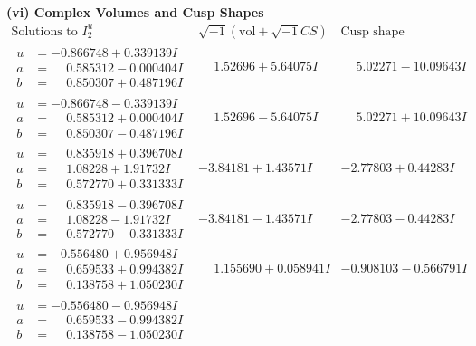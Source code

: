 \documentclass[1p]{elsarticle_modified}
\theoremstyle{definition}
\newcommand{\I}{\sqrt{-1}}
\begin{document}
\newpage\flushleft \textbf{(vi) Complex Volumes and Cusp Shapes}
$$\begin{array}{c|c|c}  
\text{Solutions to }I^u_{2}& \I (\text{vol} + \sqrt{-1}CS) & \text{Cusp shape}\\
 \hline 
\begin{aligned}
u &= -0.866748 + 0.339139 I \\
a &= \phantom{-}0.585312 - 0.000404 I \\
b &= \phantom{-}0.850307 + 0.487196 I\end{aligned}
 & \phantom{-}1.52696 + 5.64075 I & \phantom{-}5.02271 - 10.09643 I \\ \hline\begin{aligned}
u &= -0.866748 - 0.339139 I \\
a &= \phantom{-}0.585312 + 0.000404 I \\
b &= \phantom{-}0.850307 - 0.487196 I\end{aligned}
 & \phantom{-}1.52696 - 5.64075 I & \phantom{-}5.02271 + 10.09643 I \\ \hline\begin{aligned}
u &= \phantom{-}0.835918 + 0.396708 I \\
a &= \phantom{-}1.08228 + 1.91732 I \\
b &= \phantom{-}0.572770 + 0.331333 I\end{aligned}
 & -3.84181 + 1.43571 I & -2.77803 + 0.44283 I \\ \hline\begin{aligned}
u &= \phantom{-}0.835918 - 0.396708 I \\
a &= \phantom{-}1.08228 - 1.91732 I \\
b &= \phantom{-}0.572770 - 0.331333 I\end{aligned}
 & -3.84181 - 1.43571 I & -2.77803 - 0.44283 I \\ \hline\begin{aligned}
u &= -0.556480 + 0.956948 I \\
a &= \phantom{-}0.659533 + 0.994382 I \\
b &= \phantom{-}0.138758 + 1.050230 I\end{aligned}
 & \phantom{-}1.155690 + 0.058941 I & -0.908103 - 0.566791 I \\ \hline\begin{aligned}
u &= -0.556480 - 0.956948 I \\
a &= \phantom{-}0.659533 - 0.994382 I \\
b &= \phantom{-}0.138758 - 1.050230 I\end{aligned}

\end{array}$$
\end{document}
